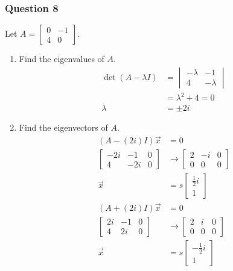 \documentclass{math}
\begin{document}
\subsubsection*{Question 8}
Let \( A = \begin{bmatrix}0 & -1 \\ 4 & 0\end{bmatrix} \).
\begin{enumerate}
  \item Find the eigenvalues of \( A \).
  \begin{align*}
    \det(A-\lambda I) &= \begin{vmatrix}
      -\lambda & -1 \\
      4 & -\lambda
    \end{vmatrix} \\
    &= \lambda^2+4 = 0 \\
    \lambda &= \pm2i
  \end{align*}
  \item Find the eigenvectors of \( A \).
  \begin{align*}
    (A-(2i)I)\vec{x} &= 0 \\
    \left[\begin{array}{cc|c}
      -2i & -1 & 0 \\
      4 & -2i & 0
    \end{array}\right] &\to \left[\begin{array}{cc|c}
      2 & -i & 0 \\
      0 & 0 & 0
    \end{array}\right] \\
    \vec{x} &= s\begin{bmatrix}\frac{1}{2}i \\ 1\end{bmatrix} \\
    (A+(2i)I)\vec{x} &= 0 \\
    \left[\begin{array}{cc|c}
      2i & -1 & 0 \\
      4 & 2i & 0
    \end{array}\right] &\to \left[\begin{array}{cc|c}
      2 & i & 0 \\
      0 & 0 & 0
    \end{array}\right] \\
    \vec{x} &= s\begin{bmatrix}-\frac{1}{2}i \\ 1\end{bmatrix}
  \end{align*}
\end{enumerate}
\end{document}
